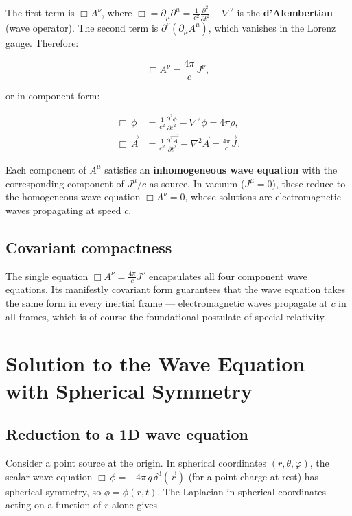 The first term is $\Box A^\nu$, where $\Box = \partial_\mu\partial^\mu = \frac{1}{c^2}\frac{\partial^2}{\partial t^2} - \nabla^2$ is the \textbf{d'Alembertian} (wave operator). The second term is $\partial^\nu(\partial_\mu A^\mu)$, which vanishes in the Lorenz gauge. Therefore:

\begin{equation}
\boxed{\Box A^\nu = \frac{4\pi}{c}\,J^\nu,}
\end{equation}

or in component form:

\begin{align}
\Box\,\phi &= \frac{1}{c^2}\frac{\partial^2\phi}{\partial t^2} - \nabla^2\phi = 4\pi\rho, \label{eq:wave_phi}\\
\Box\,\vec{A} &= \frac{1}{c^2}\frac{\partial^2\vec{A}}{\partial t^2} - \nabla^2\vec{A} = \frac{4\pi}{c}\vec{J}. \label{eq:wave_A}
\end{align}

Each component of $A^\mu$ satisfies an \textbf{inhomogeneous wave equation} with the corresponding component of $J^\mu/c$ as source. In vacuum ($J^\mu = 0$), these reduce to the homogeneous wave equation $\Box A^\nu = 0$, whose solutions are electromagnetic waves propagating at speed $c$.

\subsection{Covariant compactness}

The single equation $\Box A^\nu = \frac{4\pi}{c}J^\nu$ encapsulates all four component wave equations. Its manifestly covariant form guarantees that the wave equation takes the same form in every inertial frame --- electromagnetic waves propagate at $c$ in all frames, which is of course the foundational postulate of special relativity.

\section{Solution to the Wave Equation with Spherical Symmetry}

\subsection{Reduction to a 1D wave equation}

Consider a point source at the origin. In spherical coordinates $(r, \theta, \varphi)$, the scalar wave equation $\Box\,\phi = -4\pi\,q\,\delta^3(\vec{r})$ (for a point charge at rest) has spherical symmetry, so $\phi = \phi(r, t)$. The Laplacian in spherical coordinates acting on a function of $r$ alone gives

